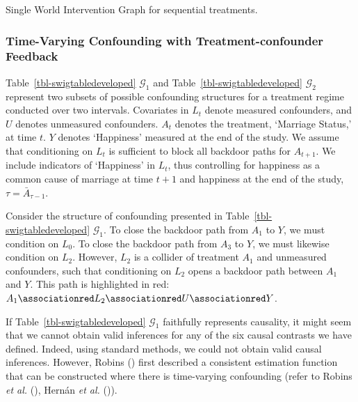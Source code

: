 \documentclass[
  single column]{article}
\begin{document}
\begin{table}

\caption{\label{tbl-swigtabledeveloped}Single World Intervention Graph
for sequential treatments.}

\centering{

\swigtabledeveloped

}

\end{table}%

\subsubsection{Time-Varying Confounding with Treatment-confounder
Feedback}\label{time-varying-confounding-with-treatment-confounder-feedback}

Table~\ref{tbl-swigtabledeveloped} \(\mathcal{G}_1\) and
Table~\ref{tbl-swigtabledeveloped} \(\mathcal{G}_2\) represent two
subsets of possible confounding structures for a treatment regime
conducted over two intervals. Covariates in \(L_t\) denote measured
confounders, and \(U\) denotes unmeasured confounders. \(A_t\) denotes
the treatment, `Marriage Status,' at time \(t\). \(Y\) denotes
`Happiness' measured at the end of the study. We assume that
conditioning on \(L_t\) is sufficient to block all backdoor paths for
\(A_{t+1}\). We include indicators of `Happiness' in \(L_t\), thus
controlling for happiness as a common cause of marriage at time \(t+1\)
and happiness at the end of the study, \(\tau = \bar{A}_{\tau -1}\).

Consider the structure of confounding presented in
Table~\ref{tbl-swigtabledeveloped} \(\mathcal{G}_1\). To close the
backdoor path from \(A_1\) to \(Y\), we must condition on \(L_0\). To
close the backdoor path from \(A_3\) to \(Y\), we must likewise
condition on \(L_2\). However, \(L_2\) is a collider of treatment
\(A_1\) and unmeasured confounders, such that conditioning on \(L_2\)
opens a backdoor path between \(A_1\) and \(Y\). This path is
highlighted in red:
\(A_1 \associationred L_2 \associationred U \associationred Y\).

If Table~\ref{tbl-swigtabledeveloped} \(\mathcal{G}_1\) faithfully
represents causality, it might seem that we cannot obtain valid
inferences for any of the six causal contrasts we have defined. Indeed,
using standard methods, we could not obtain valid causal inferences.
However, Robins () first described a
consistent estimation function that can be constructed where there is
time-varying confounding (refer to Robins \emph{et al.}
(), Hernán \emph{et al.}
()).
\end{document}
